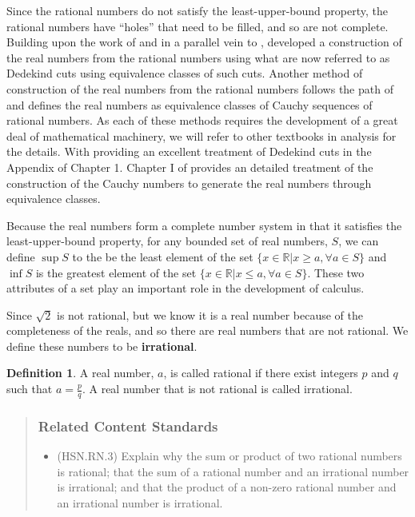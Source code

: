 \documentclass[
]{book}
\providecommand{\tightlist}{%
  \setlength{\itemsep}{0pt}\setlength{\parskip}{0pt}}
\theoremstyle{definition}
\newtheorem{definition}{Definition}[chapter]
\theoremstyle{definition}
\theoremstyle{definition}
\theoremstyle{remark}
\begin{document}
Since the rational numbers do not satisfy the least-upper-bound property, the rational numbers have ``holes'' that need to be filled, and so are not complete. Building upon the work of \citet{bertrand1840} and in a parallel vein to \citet{Heine1872}, \citet{Dedekind1872} developed a construction of the real numbers from the rational numbers using what are now referred to as Dedekind cuts using equivalence classes of such cuts. Another method of construction of the real numbers from the rational numbers follows the path of \citet{Cauchy1821} and defines the real numbers as equivalence classes of Cauchy sequences of rational numbers. As each of these methods requires the development of a great deal of mathematical machinery, we will refer to other textbooks in analysis for the details. With \citet{Rudin1976} providing an excellent treatment of Dedekind cuts in the Appendix of Chapter 1. Chapter I of \citet{Thurston1956} provides an detailed treatment of the construction of the Cauchy numbers to generate the real numbers through equivalence classes.

Because the real numbers form a complete number system in that it satisfies the least-upper-bound property, for any bounded set of real numbers, \(S\), we can define \(\sup S\) to the be the least element of the set \(\{ x \in \mathbb{R} \vert x\geq a, \forall a\in S\}\) and \(\inf S\) is the greatest element of the set \(\{x\in \mathbb{R} \vert x\leq a, \forall a\in S\}\). These two attributes of a set play an important role in the development of calculus.

Since \(\sqrt{2}\) is not rational, but we know it is a real number because of the completeness of the reals, and so there are real numbers that are not rational. We define these numbers to be \textbf{irrational}.

\begin{definition}
\protect\hypertarget{def:unnamed-chunk-112}{}{\label{def:unnamed-chunk-112} }A real number, \(a\), is called rational if there exist integers \(p\) and \(q\) such that \(a=\frac{p}{q}\). A real number that is not rational is called irrational.
\end{definition}

\begin{quote}
\hypertarget{related-content-standards-15}{%
\subsubsection*{Related Content Standards}\label{related-content-standards-15}}

\begin{itemize}
\tightlist
\item
  (HSN.RN.3) Explain why the sum or product of two rational numbers is rational; that the sum of a rational number and an irrational number is irrational; and that the product of a non-zero rational number and an irrational number is irrational.
\end{itemize}
\end{quote}
\end{document}
